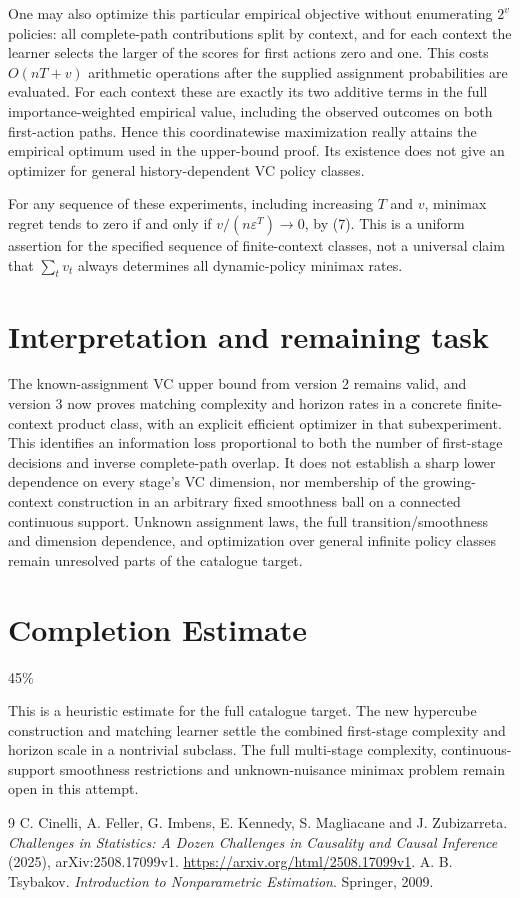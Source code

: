 \documentclass[11pt]{article}
\theoremstyle{definition}
\begin{document}
One may also optimize this particular empirical objective without
enumerating $2^v$ policies: all complete-path contributions split by
context, and for each context the learner selects the larger of the
scores for first actions zero and one. This costs $O(nT+v)$ arithmetic
operations after the supplied assignment probabilities are evaluated.
For each context these are exactly its two additive terms in the full
importance-weighted empirical value, including the observed outcomes
on both first-action paths. Hence this coordinatewise maximization
really attains the empirical optimum used in the upper-bound proof.
Its existence does not give an optimizer for general history-dependent
VC policy classes.

For any sequence of these experiments, including increasing $T$ and
$v$, minimax regret tends to zero if and only if
$v/(n\varepsilon^T)\longrightarrow0$, by (7).
This is a uniform assertion for the specified sequence of finite-context
classes, not a universal claim that $\sum_t v_t$ always determines
all dynamic-policy minimax rates.

\section*{Interpretation and remaining task}
The known-assignment VC upper bound from version 2 remains valid, and
version 3 now proves matching complexity and horizon rates in a concrete
finite-context product class, with an explicit efficient optimizer in
that subexperiment. This identifies an information loss proportional to
both the number of first-stage decisions and inverse complete-path
overlap. It does not establish a sharp lower dependence on every stage's
VC dimension, nor membership of the growing-context construction in an
arbitrary fixed smoothness ball on a connected continuous support.
Unknown assignment laws, the full transition/smoothness and dimension
dependence, and optimization over general infinite policy classes remain
unresolved parts of the catalogue target.

\section{Completion Estimate}
45\%

This is a heuristic estimate for the full catalogue target. The new
hypercube construction and matching learner settle the combined
first-stage complexity and horizon scale in a nontrivial subclass. The
full multi-stage complexity, continuous-support smoothness restrictions
and unknown-nuisance minimax problem remain open in this attempt.

\begin{thebibliography}{9}
 C. Cinelli, A. Feller, G. Imbens, E. Kennedy, S. Magliacane and J. Zubizarreta.
\emph{Challenges in Statistics: A Dozen Challenges in Causality and Causal Inference} (2025), arXiv:2508.17099v1.
\url{https://arxiv.org/html/2508.17099v1}.
 A. B. Tsybakov.
\emph{Introduction to Nonparametric Estimation}.
Springer, 2009.
\end{thebibliography}
\end{document}
